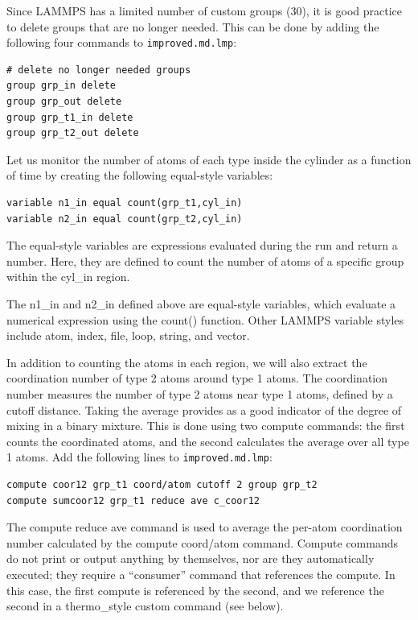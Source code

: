 \documentclass[9pt,tutorial]{livecoms}
\newcommand{\lmpcmd}[1]{\colorbox{listing}{\textcolor{command}{\small{#1}}}} %
\newcommand{\flecmd}[1]{\textcolor{command}{\texttt{#1}}} %
\begin{document}
Since LAMMPS has a limited number of custom groups (30), it is good practice
to delete groups that are no longer needed.  This can be done by adding the
following four commands to \flecmd{improved.md.lmp}:
\begin{lstlisting}
# delete no longer needed groups
group grp_in delete
group grp_out delete
group grp_t1_in delete
group grp_t2_out delete
\end{lstlisting}

Let us monitor the number of atoms of each type inside the cylinder as a
function of time by creating the following equal-style variables:
\begin{lstlisting}
variable n1_in equal count(grp_t1,cyl_in)
variable n2_in equal count(grp_t2,cyl_in)
\end{lstlisting}
The equal-style \lmpcmd{variables} are expressions evaluated
during the run and return a number.  Here, they are defined to count
the number of atoms of a specific group within the \lmpcmd{cyl\_in} region.

\begin{note}
  The \lmpcmd{n1\_in} and \lmpcmd{n2\_in} defined above are
  equal-style variables, which evaluate a numerical expression using the
  \lmpcmd{count()} function.  Other LAMMPS variable styles include
  atom, index, file, loop, string, and vector.
\end{note}

In addition to counting the atoms in each region, we will also extract
the coordination number of type 2 atoms around type 1 atoms.  The
coordination number measures the number of type 2 atoms near
type 1 atoms, defined by a cutoff distance.  Taking the average provides
as a good indicator of the degree of mixing in a binary mixture.  This
is done using two \lmpcmd{compute} commands:  the first counts the
coordinated atoms, and the second calculates the average over all type 1
atoms.  Add the following lines to \flecmd{improved.md.lmp}:
\begin{lstlisting}
compute coor12 grp_t1 coord/atom cutoff 2 group grp_t2
compute sumcoor12 grp_t1 reduce ave c_coor12
\end{lstlisting}
The \lmpcmd{compute reduce ave} command is used to average the per-atom
coordination number calculated by the \lmpcmd{compute coord/atom}
command.  Compute commands do not print or output
anything by themselves, nor are they automatically executed; they
require a ``consumer'' command that references the compute.  In this case, the
first compute is referenced by the second, and we reference the second
in a \lmpcmd{thermo\_style custom} command (see below).
\end{document}
